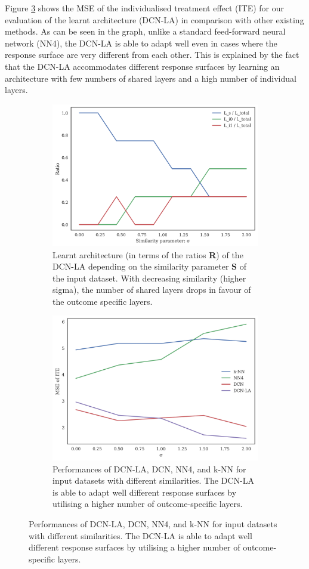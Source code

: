Figure \ref{fig:syn-sigma-mse} shows the MSE of the individualised treatment effect (ITE) for our evaluation of the learnt architecture (DCN-LA) in comparison with other existing methods. As can be seen in the graph, unlike a standard feed-forward neural network (NN4), the DCN-LA is able to adapt well even in cases where the response surface are very different from each other. This is explained by the fact that the DCN-LA accommodates different response surfaces by learning an architecture with few numbers of shared layers and a high number of individual layers. \\
\begin{figure}[h]
	\centering
		\caption{A caption for both images}\label{fig:syn-sigma}
	\begin{subfigure}{\linewidth}
		\centering
		\includegraphics[width=.8\linewidth]{figures/chapter-5/syn-ratio-sigma.png}
		\caption{Learnt architecture (in terms of the ratios \textbf{R}) of the DCN-LA depending on the similarity parameter \textbf{S} of the input dataset. With decreasing similarity (higher sigma), the number of shared layers drops in favour of the outcome specific layers.}\label{fig:syn-sigma-ratios}
	\end{subfigure}
	\begin{subfigure}{\linewidth}
		\centering
		\includegraphics[width=.8\linewidth]{figures/chapter-5/syn-mse-sigma.png}
		\caption{Performances of DCN-LA, DCN, NN4, and k-NN for input datasets with different similarities. The DCN-LA is able to adapt well different response surfaces by utilising a higher number of outcome-specific layers. }\label{fig:syn-sigma-mse}
	\end{subfigure}  
 
\end{figure}  

